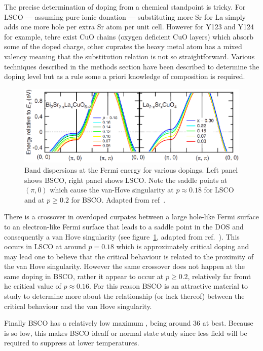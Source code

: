 The precise determination of doping from a chemical standpoint is tricky. For \ac{LSCO} --- assuming pure ionic donation --- substituting more Sr for La simply adds one more hole per extra Sr atom per unit cell. However for \ac{Y123} and \ac{Y124} for example, tehre exist CuO chains (oxygen deficient CuO layers) which absorb some of the doped charge, other cuprates the heavy metal atom has a mixed valency meaning that the substitution relation is not so straightforward. Various techniques described in the methods section have been described to determine the doping level but as a rule some a priori knowledge of composition is required.
\begin{figure}[htbp]
    \begin{center}
        \includegraphics[scale=0.9]{Chapter-Introduction/Figures/VanHoveBSCOLSCO/VanHoveBSCOLSCO}
        \caption{Band dispersions at the Fermi energy for various dopings. Left panel shows \ac{BSCO}, right panel shows \ac{LSCO}. Note the saddle points at $(\pi, 0)$ which cause the van-Hove singularity at $p\approx 0.18$ for \ac{LSCO} and at $p \geq 0.2$ for \ac{BSCO}. Adapted from ref~\cite{Hashimoto2008}.}
        \label{Fig:Intro:VanHoveBSCOLSCO}
    \end{center}
\end{figure}
There is a crossover in overdoped curpates between a large hole-like Fermi surface to an electron-like Fermi surface that leads to a saddle point in the \ac{DOS} and consequently a van Hove singularity (see figure~\ref{Fig:Intro:VanHoveBSCOLSCO}, adapted from ref.~\cite{Hashimoto2008}). This occurs in \ac{LSCO} at around $p=0.18$ which is approximately critical doping and may lead one to believe that the critical behaviour is related to the proximity of the van Hove singularity. However the same crossover does not happen at the same doping in \ac{BSCO}, rather it appear to occur at $p \geq 0.2$, relatively far fromt he critical value of $p \approx 0.16$. For this reason \ac{BSCO} is an attractive material to study to determine more about the relationship (or lack thereof) between the critical behaviour and the van Hove singularity.

Finally \ac{BSCO} has a relatively low maximum \Tc, being around \unit{36}{\kelvin} at best. Because \Tc is so low, this makes \ac{BSCO} idealf or normal state study since less field will be required to suppress \Tc at lower temperatures.
